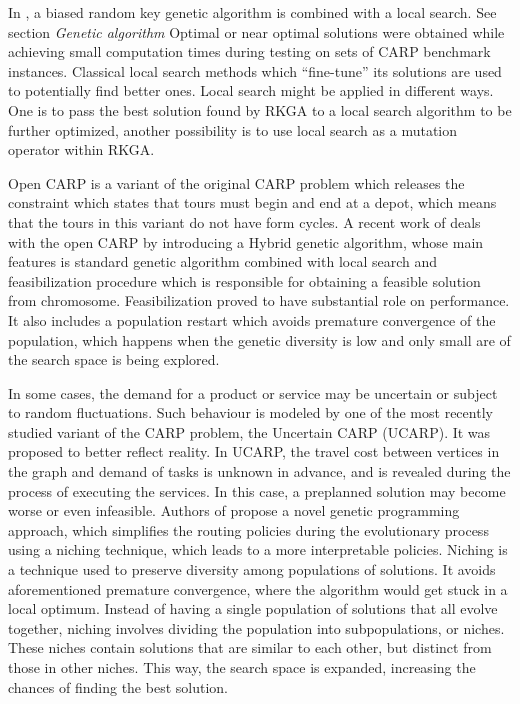 \documentclass[oneside]{ctuthesis}
\theoremstyle{plain}
\theoremstyle{definition}
\theoremstyle{note}
\begin{document}
In \cite{martinez2011brkga}, a biased random key genetic algorithm is combined with a local search. See section \emph{Genetic algorithm} Optimal or near optimal solutions were obtained while achieving small computation times during testing on sets of CARP benchmark instances. Classical local search methods which “fine-tune” its solutions are used to potentially find better ones. Local search might be applied in different ways. One is to pass the best solution found by RKGA to a local search algorithm to be further optimized, another possibility is to use local search as a mutation operator within RKGA.

Open CARP is a variant of the original CARP problem which releases the constraint which states that tours must begin and end at a depot, which means that the tours in this variant do not have form cycles. A recent work of \cite{arakaki2018hybrid} deals with the open CARP by introducing a Hybrid genetic algorithm, whose main features is standard genetic algorithm combined with local search and feasibilization procedure which is responsible for obtaining a feasible solution from chromosome. Feasibilization proved to have substantial role on performance. It also includes a population restart which avoids premature convergence of the population, which happens when the genetic diversity is low and only small are of the search space is being explored.

In some cases, the demand for a product or service may be uncertain or subject to random fluctuations. Such behaviour is modeled by one of the most recently studied variant of the CARP problem, the Uncertain CARP (UCARP). It was proposed to better reflect reality. In UCARP, the travel cost between vertices in the graph and demand of tasks is unknown in advance, and is revealed during the process of executing the services. In this case, a preplanned solution may become worse or even infeasible. Authors of \cite{wang2021genetic} propose a novel genetic programming approach, which simplifies the routing policies during the evolutionary process using a niching technique, which leads to a more interpretable policies. Niching is a technique used to preserve diversity among populations of solutions. It avoids aforementioned premature convergence, where the algorithm would get stuck in a local optimum. Instead of having a single population of solutions that all evolve together, niching involves dividing the population into subpopulations, or niches. These niches contain solutions that are similar to each other, but distinct from those in other niches. This way, the search space is expanded, increasing the chances of finding the best solution.
\end{document}
